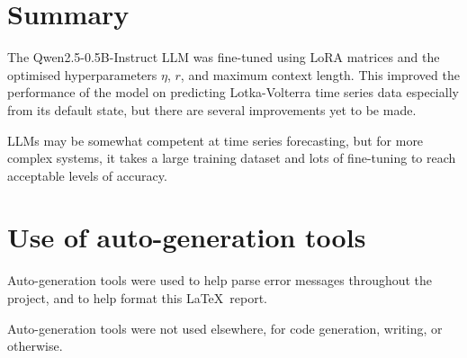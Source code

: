 \documentclass[11pt,a4paper]{article}
\begin{document}
\section{Summary}
The Qwen2.5-0.5B-Instruct LLM was fine-tuned using LoRA matrices and the optimised hyperparameters $\eta$, $r$, and maximum context length. This improved the performance of the model on predicting Lotka-Volterra time series data especially from its default state, but there are several improvements yet to be made.

LLMs may be somewhat competent at time series forecasting, but for more complex systems, it takes a large training dataset and lots of fine-tuning to reach acceptable levels of accuracy.
\clearpage


\appendix
\section{Use of auto-generation tools}
Auto-generation tools were used to help parse error messages throughout the project, and to help format this \LaTeX\ report.

Auto-generation tools were not used elsewhere, for code generation, writing, or otherwise.
\end{document}
